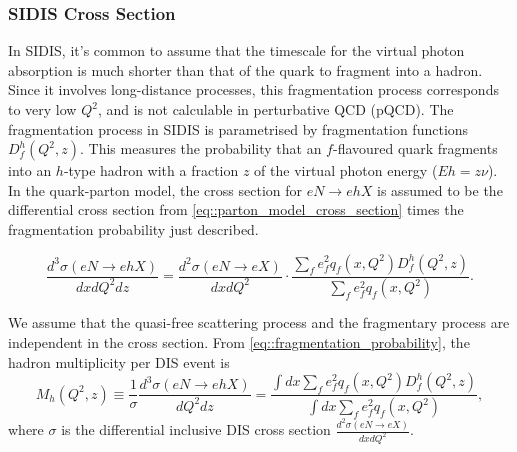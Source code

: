 \subsubsection{SIDIS Cross Section}
\label{sssec::sidis_cross_section}
    In SIDIS, it's common to assume that the timescale for the virtual photon absorption is much shorter than that of the quark to fragment into a hadron.
    Since it involves long-distance processes, this fragmentation process corresponds to very low $Q^2$, and is not calculable in perturbative QCD (pQCD).
    The fragmentation process in SIDIS is parametrised by fragmentation functions $D_f^h(Q^2, z)$.
    This measures the probability that an $f$-flavoured quark fragments into an $h$-type hadron with a fraction $z$ of the virtual photon energy ($Eh=z\nu$).
    In the quark-parton model, the cross section for $eN \rightarrow ehX$ is assumed to be the differential cross section from \eqref{eq::parton_model_cross_section} times the fragmentation probability just described.

    \begin{equation}
        \label{eq::fragmentation_probability}
        \frac{d^3\sigma(eN \rightarrow ehX)}{dxdQ^2dz} =
                \frac{d^2\sigma(eN \rightarrow eX)}{dxdQ^2} \cdot
                \frac{\sum_fe^2_f q_f(x,Q^2) D^h_f(Q^2,z)}{\sum_f e^2_f q_f(x,Q^2)}.
    \end{equation}

    We assume that the quasi-free scattering process and the fragmentary process are independent in the cross section.
    From \eqref{eq::fragmentation_probability}, the hadron multiplicity per DIS event is
    \begin{equation*}
        M_h(Q^2,z)
                \equiv \frac{1}{\sigma} \frac{d^3\sigma(eN \rightarrow ehX)}{dQ^2dz}
                = \frac{\int dx \sum_f e^2_f q_f(x,Q^2) D^h_f(Q^2,z)}{\int dx \sum_f e^2_f q_f(x,Q^2)},
    \end{equation*}
    where $\sigma$ is the differential inclusive DIS cross section $\frac{d^2\sigma(eN \rightarrow eX)}{dxdQ^2}$.
